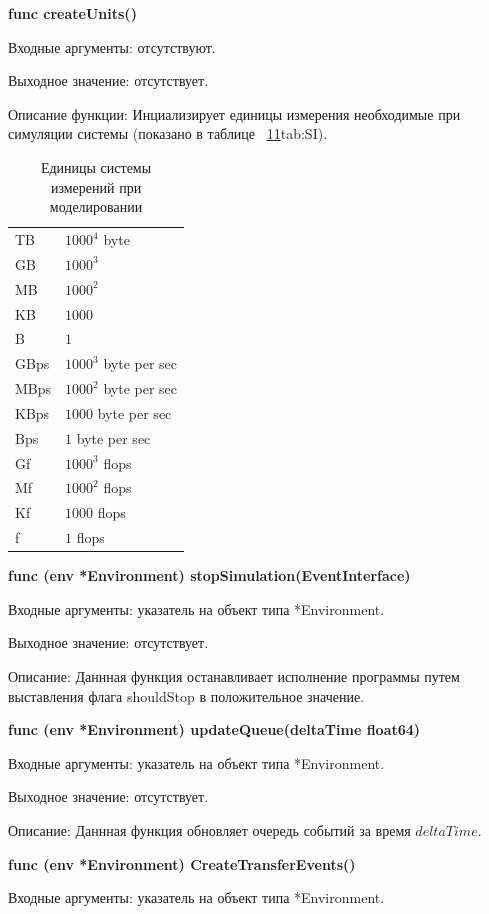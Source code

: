 \textbf{func createUnits()}

Входные аргументы: отсутствуют.

Выходное значение: отсутствует.

Описание функции: Инциализирует единицы измерения необходимые при симуляции системы (показано в таблице ~\ref{tab:SI}\ref{tab:SI}{tab:SI}).
\begin{table}[]
\centering
\caption{Единицы системы измерений при моделировании}
\label{tab:SI}
\begin{tabularx}{\textwidth}{|X|X|}
TB   & $1000^4$ byte         \\
GB   & $1000^3$              \\
MB   & $1000^2$              \\
KB   & $1000$                \\
B    & $1$                   \\
GBps & $1000^3$ byte per sec \\
MBps & $1000^2$ byte per sec \\
KBps & $1000$ byte per sec   \\
Bps  & $1$ byte per sec      \\
Gf   & $1000^3$ flops        \\
Mf   & $1000^2$ flops        \\
Kf   & $1000$ flops          \\
f    & $1$ flops            
\end{tabularx}
\end{table}

\textbf{func (env *Environment) stopSimulation(EventInterface)}

Входные аргументы: указатель на объект типа *Environment.

Выходное значение: отсутствует.

Описание: Даннная функция останавливает исполнение программы путем выставления флага shouldStop в положительное значение.

\textbf{func (env *Environment) updateQueue(deltaTime float64) }

Входные аргументы: указатель на объект типа *Environment.

Выходное значение: отсутствует.

Описание: Даннная функция обновляет очередь событий за время $deltaTime$. 

\textbf{func (env *Environment) CreateTransferEvents()}

Входные аргументы: указатель на объект типа *Environment.

